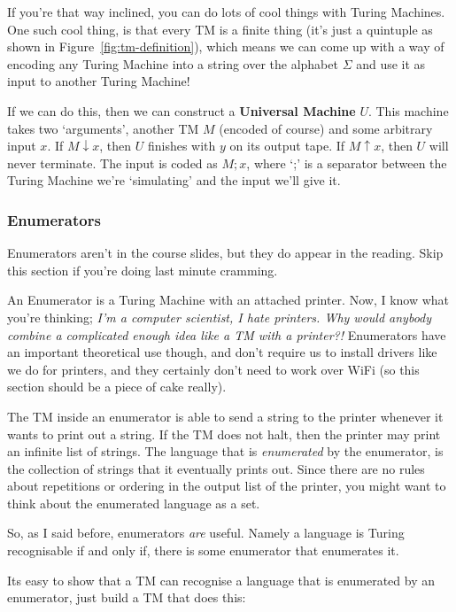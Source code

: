 If you're that way inclined, you can do lots of cool things with Turing
Machines. One such cool thing, is that every TM is a finite thing (it's just a
quintuple as shown in Figure~\ref{fig:tm-definition}), which means we can come
up with a way of encoding any Turing Machine into a string over the alphabet
$\Sigma$ and use it as input to another Turing Machine!

If we can do this, then we can construct a \textbf{Universal Machine} $U$. This
machine takes two `arguments', another TM $M$ (encoded of course) and some
arbitrary input $x$. If $M \downarrow x$, then $U$ finishes with $y$ on its
output tape. If $M \uparrow x$, then $U$ will never terminate. The input is
coded as $M;x$, where `;' is a separator between the Turing Machine we're
`simulating' and the input we'll give it.

\subsubsection{Enumerators}

Enumerators aren't in the course slides, but they do appear in the reading. Skip
this section if you're doing last minute cramming.

An Enumerator is a Turing Machine with an attached printer. Now, I know what
you're thinking; \textit{I'm a computer scientist, I hate printers. Why would
anybody combine a complicated enough idea like a TM with a printer?!}
Enumerators have an important theoretical use though, and don't require us to
install drivers like we do for printers, and they certainly don't need to work
over WiFi (so this section should be a piece of cake really).

The TM inside an enumerator is able to send a string to the printer whenever it
wants to print out a string. If the TM does not halt, then the printer may print
an infinite list of strings. The language that is \textit{enumerated} by the
enumerator, is the collection of strings that it eventually prints out. Since
there are no rules about repetitions or ordering in the output list of the
printer, you might want to think about the enumerated language as a set.

So, as I said before, enumerators \textit{are} useful. Namely a language is
Turing recognisable if and only if, there is some enumerator that enumerates it.

Its easy to show that a TM can recognise a language that is enumerated by an
enumerator, just build a TM that does this:

